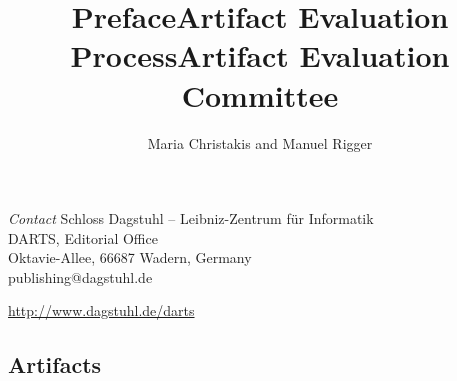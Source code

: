 \documentclass[a4paper,UKenglish]{dartsmaster-v2019}
\begin{document}
\begin{publicationinfo}
\bigskip
\emph{Contact}\newline
Schloss Dagstuhl -- Leibniz-Zentrum f\"ur Informatik\\
DARTS, Editorial Office\\
Oktavie-Allee, 66687 Wadern, Germany\\
publishing@dagstuhl.de


\bigskip

\url{http://www.dagstuhl.de/darts}

 \thispagestyle{empty}
 \onecolumn

\newpage

\end{publicationinfo}




\begin{contentslist}

\contitem
\title{Preface}
\author{Maria Christakis and Manuel Rigger}

\contitem
\title{Artifact Evaluation Process}
\author{ }

\contitem
\title{Artifact Evaluation Committee}
\author{ }


\part{Artifacts}


\end{contentslist}
\end{document}
